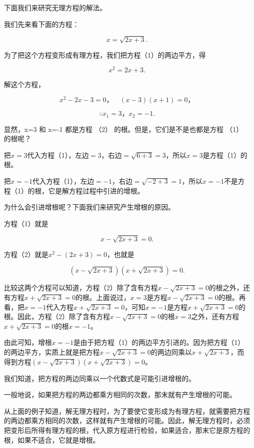 下面我们来研究无理方程的解法。

我们先来看下面的方程：

\[
x = \sqrt {2 x + 3}. \tag{1}
\]

为了把这个方程变形成有理方程，我们把方程（1）的两边平方，得

\[
x ^ {2} = 2 x + 3. \tag{2}
\]

解这个方程，

\[
x ^ {2} - 2 x - 3 = 0\text{，} \quad (x - 3) (x + 1) = 0\text{，}
\]

\[
\therefore x _ {1} = 3\text{，} x _ {2} = - 1.
\]

显然，x=3 和 x=-1 都是方程 （2） 的根。但是，它们是不是也都是方程 （1）
的根呢？

把\(x = 3\)代入方程（1），左边\(= 3\)，右边\(= \sqrt{6 + 3} = 3\)，所以\(x = 3\)是方程（1）的根。

把\(x = -1\)代入方程（1），左边\(= -1\)，右边\(= \sqrt{-2 + 3} = 1\)，所以\(x = -1\)不是方程（1）的根，它是解方程过程中引进的增根。

为什么会引进增根呢？下面我们来研究产生增根的原因。

方程（1）就是

\[
x - \sqrt {2 x + 3} = 0.
\]

方程（2）就是\(x^{2} - (2x + 3) = 0\)，也就是

\[
(x - \sqrt {2 x + 3}) (x + \sqrt {2 x + 3}) = 0.
\]

比较这两个方程可以知道，方程（2）除了含有方程\(x - \sqrt{2x + 3} = 0\)的根之外，还有方程\(x + \sqrt{2x + 3} = 0\)的根。上面说过，\(x = 3\)是方程\(x - \sqrt{2x + 3} = 0\)的根。再看，把\(x = -1\)代入方程\(x + \sqrt{2x + 3} = 0\)，可知\(x = -1\)是方程\(x + \sqrt{2x + 3} = 0\)的根。因此，方程（2）除了含有方程\(x - \sqrt{2x + 3} = 0\)的根\(x = 3\)之外，还有方程\(x + \sqrt{2x + 3} = 0\)的根\(x = -1\)。

由此可知，增根\(x = -1\)是由于把方程（1）的两边平方引进的。因为把方程（1）的两边平方，实质上就是把方程\(x - \sqrt{2x + 3} = 0\)的两边同乘以\(x + \sqrt{2x + 3}\)，而得到方程\((x - \sqrt{2x + 3})(x + \sqrt{2x + 3}) = 0\)。

我们知道，把方程的两边同乘以一个代数式是可能引进增根的。

一般地说，如果把方程的两边都乘方相同的次数，那末就有产生增根的可能。

从上面的例子知道，解无理方程时，为了要使它变形成为有理方程，就需要把方程的两边都乘方相同的次数，这样就有产生增根的可能。因此，解无理方程时，必须把变形后所得有理方程的根，代入原方程进行检验，如果适合，那末它是原方程的根，如果不适合，它就是增根。

